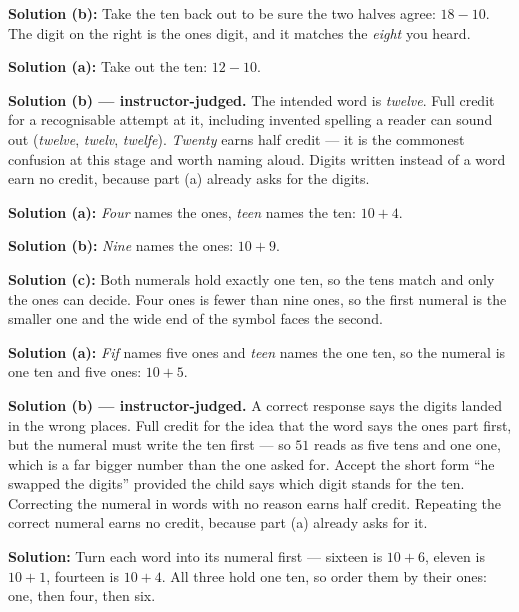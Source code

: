 \documentclass[12pt]{article}
\begin{document}
\textbf{Solution (b):} Take the ten back out to be sure the two halves agree: $18 - 10$. The digit on the right is the ones digit, and it matches the \emph{eight} you heard. 


\textbf{Solution (a):} Take out the ten: $12 - 10$. 

\textbf{Solution (b) --- instructor-judged.} The intended word is \emph{twelve}. Full credit for a recognisable attempt at it, including invented spelling a reader can sound out (\emph{twelve}, \emph{twelv}, \emph{twelfe}). \emph{Twenty} earns half credit --- it is the commonest confusion at this stage and worth naming aloud. Digits written instead of a word earn no credit, because part (a) already asks for the digits.


\textbf{Solution (a):} \emph{Four} names the ones, \emph{teen} names the ten: $10 + 4$. 

\textbf{Solution (b):} \emph{Nine} names the ones: $10 + 9$. 

\textbf{Solution (c):} Both numerals hold exactly one ten, so the tens match and only the ones can decide. Four ones is fewer than nine ones, so the first numeral is the smaller one and the wide end of the symbol faces the second. 


\textbf{Solution (a):} \emph{Fif} names five ones and \emph{teen} names the one ten, so the numeral is one ten and five ones: $10 + 5$. 

\textbf{Solution (b) --- instructor-judged.} A correct response says the digits landed in the wrong places. Full credit for the idea that the word says the ones part first, but the numeral must write the ten first --- so $51$ reads as five tens and one one, which is a far bigger number than the one asked for. Accept the short form ``he swapped the digits'' provided the child says which digit stands for the ten. Correcting the numeral in words with no reason earns half credit. Repeating the correct numeral earns no credit, because part (a) already asks for it.


\textbf{Solution:} Turn each word into its numeral first --- sixteen is $10 + 6$, eleven is $10 + 1$, fourteen is $10 + 4$. All three hold one ten, so order them by their ones: one, then four, then six. 
\end{document}
